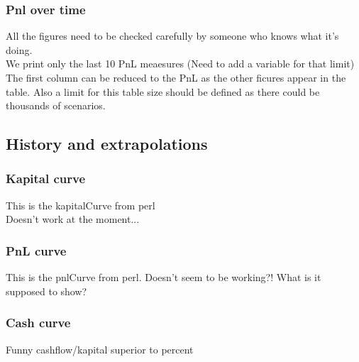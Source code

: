 \documentclass[8pt]{article} %
\begin{document}
\subsubsection{Pnl over time}



All the figures need to be checked carefully by someone who knows what it's doing.\\
We print only the last 10 PnL meaesures (Need to add a variable for that limit)\\
The first column can be reduced to the PnL as the other ficures appear in the table. Also a limit for this table size should be defined as there could be thousands of scenarios.\\

\subsection{History and extrapolations}

\subsubsection{Kapital curve}



This is the kapitalCurve from perl\\ Doesn't work at the moment...\\

\subsubsection{PnL curve}


This is the pnlCurve from perl. Doesn't seem to be working?! What is it supposed to show?\\
%

\subsubsection{Cash curve}

Funny cashflow/kapital superior to percent\\



\end{document}
